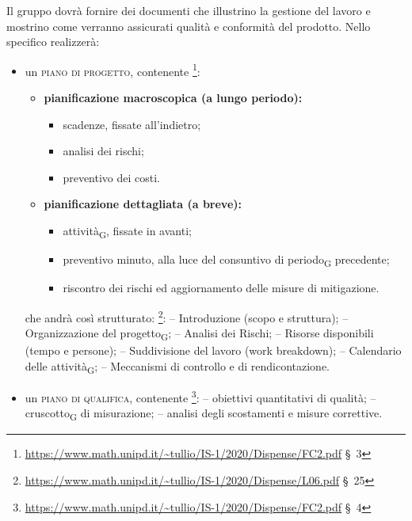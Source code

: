         \label{pianificazione}
            Il gruppo dovrà fornire dei documenti che illustrino la gestione del lavoro e mostrino come verranno assicurati qualità e conformità del prodotto. Nello specifico realizzerà:
            \begin{itemize}
                \item un \textsc{piano di progetto}, contenente \footnote{\url{https://www.math.unipd.it/~tullio/IS-1/2020/Dispense/FC2.pdf} \S\ 3}:
                    \begin{itemize}
                        \item \textbf{pianificazione macroscopica (a lungo periodo):}
                        \begin{itemize}
                            \item scadenze, fissate all'indietro;
                            \item analisi dei rischi;
                            \item preventivo dei costi.
                        \end{itemize}

                        \item \textbf{pianificazione dettagliata (a breve):}
                        \begin{itemize}
                            \item attività\textsubscript{G}, fissate in avanti;
                            \item preventivo minuto, alla luce del consuntivo di periodo\textsubscript{G} precedente;
                            \item riscontro dei rischi ed aggiornamento delle misure di mitigazione.
                        \end{itemize}

                    \end{itemize}

                    che andrà così strutturato: \footnote{\url{https://www.math.unipd.it/~tullio/IS-1/2020/Dispense/L06.pdf} \S\ 25}:
                    \subitem -- Introduzione (scopo e struttura);
                    \subitem -- Organizzazione del progetto\textsubscript{G};
                    \subitem -- Analisi dei Rischi;
                    \subitem -- Risorse disponibili (tempo e persone);
                    \subitem -- Suddivisione del lavoro (work breakdown);
                    \subitem -- Calendario delle attività\textsubscript{G};
                    \subitem -- Meccanismi di controllo e di rendicontazione.

                \item un \textsc{piano di qualifica}, contenente \footnote{\url{https://www.math.unipd.it/~tullio/IS-1/2020/Dispense/FC2.pdf} \S\ 4}:
                    \subitem -- obiettivi quantitativi di qualità;
                    \subitem -- cruscotto\textsubscript{G} di misurazione;
                    \subitem -- analisi degli scostamenti e misure correttive.
            \end{itemize}


